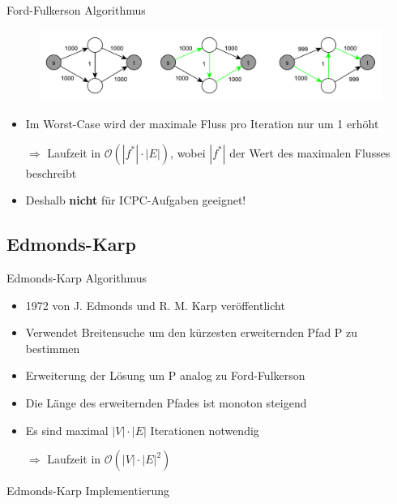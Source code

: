 \documentclass[18pt]{beamer}
\begin{document}
\begin{frame}{Ford-Fulkerson Algorithmus}
\begin{figure}
\includegraphics[width = \textwidth]{img/Jakob_Ford3.pdf}
\end{figure}
\begin{itemize}
	\item Im Worst-Case wird der maximale Fluss pro Iteration nur um 1 erh\"oht
	\item[$\Rightarrow$]  Laufzeit in $\mathcal O(|f^*|\cdot |E|)$, wobei $|f^*|$ der Wert des maximalen Flusses beschreibt
	\item Deshalb \textbf{nicht} f\"ur ICPC-Aufgaben geeignet!
\end{itemize}
\end{frame}

\subsection{Edmonds-Karp}
\begin{frame}{Edmonds-Karp Algorithmus}
\begin{itemize}
\item 1972 von J. Edmonds und R. M. Karp ver\"offentlicht
\item Verwendet Breitensuche um den k\"urzesten erweiternden Pfad P zu bestimmen
\item Erweiterung der L\"osung um P analog zu Ford-Fulkerson
\item Die L\"ange des erweiternden Pfades ist monoton steigend
\item Es sind maximal $|V|\cdot |E|$ Iterationen notwendig
\item[$\Rightarrow$] Laufzeit in $\mathcal O(|V| \cdot |E|^2)$
\end{itemize}
\end{frame}

\begin{frame}{Edmonds-Karp Implementierung}
\SetEndCharOfAlgoLine{}
\begin{algorithm}[H]
	\caption{Edmonds-Karp}
\end{algorithm}
\end{frame}
\end{document}
